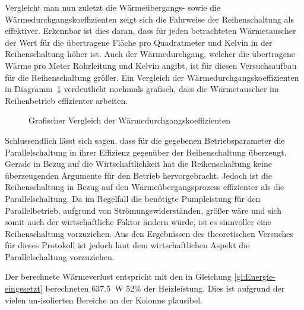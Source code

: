Vergleicht man nun zuletzt die Wärmeübergangs- sowie die Wärmedurchgangskoeffizienten zeigt sich die Fahrweise der Reihenschaltung als effektiver. Erkennbar ist dies daran, dass für jeden betrachteten Wärmetauscher der Wert für die übertragene Fläche pro Quadratmeter und Kelvin in der Reihenschaltung höher ist. Auch der Wärmedurchgang, welcher die übertragene Wärme pro Meter Rohrleitung und Kelvin angibt, ist für diesen Versuchsaufbau für die Reihenschaltung größer. Ein Vergleich der Wärmedurchgangskoeffizienten in \mbox{Diagramm \ref{dia:durchng}} verdeutlicht nochmals grafisch, dass die Wärmetauscher im Reihenbetrieb effizienter arbeiten.

\begin{figure}[h!]
	\begin{center}
		\caption{Grafischer Vergleich der Wärmedurchgangskoeffizienten}
		\label{dia:durchng}
	\end{center}
\end{figure}
\FloatBarrier
\newpage
Schlussendlich lässt sich sagen, dass für die gegebenen Betriebsparameter die Parallelschaltung in ihrer Effizienz gegenüber der Reihenschaltung überzeugt. Gerade in Bezug auf die Wirtschaftlichkeit hat die Reihenschaltung keine überzeugenden Argumente für den Betrieb hervorgebracht. Jedoch ist die Reihenschaltung in Bezug auf den Wärmeübergangsprozess effizienter als die Parallelschaltung. Da im Regelfall die benötigte Pumpleistung für den Parallelbetrieb, aufgrund von Strömungswiderständen, größer wäre und sich somit auch der wirtschaftliche Faktor ändern würde, ist es sinnvoller eine Reihenschaltung vorzuziehen. Aus den Ergebnissen des theoretischen Versuches für dieses Protokoll ist jedoch laut dem wirtschaftlichen Aspekt die Parallelschaltung vorzuziehen.

Der berechnete Wärmeverlust entspricht mit den in Gleichung \eqref{gl:Energie-eingesetzt} berechneten \SI{637,5}{\watt} 52\% der Heizleistung. Dies ist aufgrund der vielen un-isolierten Bereiche an der Kolonne plausibel.